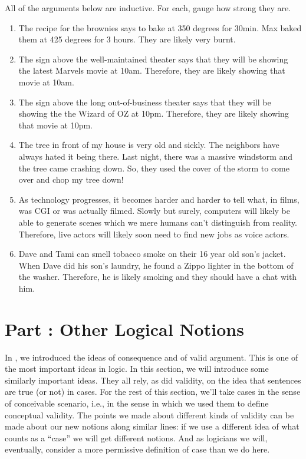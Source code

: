 \problempart
\label{pr.strength}
All of the arguments below are inductive. For each, gauge how strong they are.
\begin{enumerate}
\item The recipe for the brownies says to bake at 350 degrees for 30min. Max baked them at 425 degrees for 3 hours. They are likely very burnt.
\item The sign above the well-maintained theater says that they will be showing the latest Marvels movie at 10am. Therefore, they are likely showing that movie at 10am.
\item The sign above the long out-of-business theater says that they will be showing the the Wizard of OZ at 10pm. Therefore, they are likely showing that movie at 10pm. 
\item The tree in front of my house is very old and sickly. The neighbors have always hated it being there. Last night, there was a massive windstorm and the tree came crashing down. So, they used the cover of the storm to come over and chop my tree down!
\item As technology progresses, it becomes harder and harder to tell what, in films, was CGI or was actually filmed. Slowly but surely, computers will likely be able to generate scenes which we mere humans can't distinguish from reality. Therefore, live actors will likely soon need to find new jobs as voice actors.  
\item Dave and Tami can smell tobacco smoke on their 16 year old son's jacket. When Dave did his son's laundry, he found a Zippo lighter in the bottom of the washer. Therefore, he is likely smoking and they should have a chat with him.  
\end{enumerate}

\chapter{Part \thechapcount: Other Logical Notions}\setcounter{seccount}{1}
\label{part.logicalnotions}
In , we introduced the ideas of consequence and of valid argument. This is one of the most important ideas in logic. In this section, we will introduce some similarly important ideas. They all rely, as did validity, on the idea that sentences are true (or not) in cases. For the rest of this section, we’ll take cases in the sense of conceivable scenario, i.e., in the sense in which we used them to define conceptual validity. The points we made about different kinds of validity can be made about our new notions along similar lines: if we use a different idea of what counts as a “case” we will get different notions. And as logicians we will, eventually, consider a more permissive definition of case than we do here.
